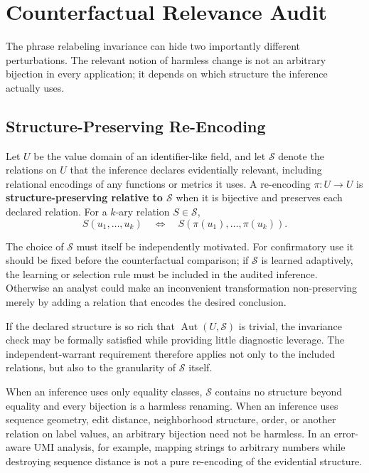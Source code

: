 \documentclass[12pt]{article}
\begin{document}
\section{Counterfactual Relevance Audit}

The phrase relabeling invariance can hide two importantly different perturbations. The relevant notion of harmless change is not an arbitrary bijection in every application; it depends on which structure the inference actually uses.

\subsection{Structure-Preserving Re-Encoding}

Let \(U\) be the value domain of an identifier-like field, and let \(\mathcal S\) denote the relations on \(U\) that the inference declares evidentially relevant, including relational encodings of any functions or metrics it uses. A re-encoding \(\pi:U\to U\) is \textbf{structure-preserving relative to \(\mathcal S\)} when it is bijective and preserves each declared relation. For a \(k\)-ary relation \(S\in\mathcal S\),
\[
S(u_1,\ldots,u_k)
\quad\Longleftrightarrow\quad
S(\pi(u_1),\ldots,\pi(u_k)).
\]

The choice of \(\mathcal S\) must itself be independently motivated. For confirmatory use it should be fixed before the counterfactual comparison; if \(\mathcal S\) is learned adaptively, the learning or selection rule must be included in the audited inference. Otherwise an analyst could make an inconvenient transformation non-preserving merely by adding a relation that encodes the desired conclusion.

If the declared structure is so rich that \(\operatorname{Aut}(U,\mathcal S)\) is trivial, the invariance check may be formally satisfied while providing little diagnostic leverage. The independent-warrant requirement therefore applies not only to the included relations, but also to the granularity of \(\mathcal S\) itself.

When an inference uses only equality classes, \(\mathcal S\) contains no structure beyond equality and every bijection is a harmless renaming. When an inference uses sequence geometry, edit distance, neighborhood structure, order, or another relation on label values, an arbitrary bijection need not be harmless. In an error-aware UMI analysis, for example, mapping strings to arbitrary numbers while destroying sequence distance is not a pure re-encoding of the evidential structure.
\end{document}
